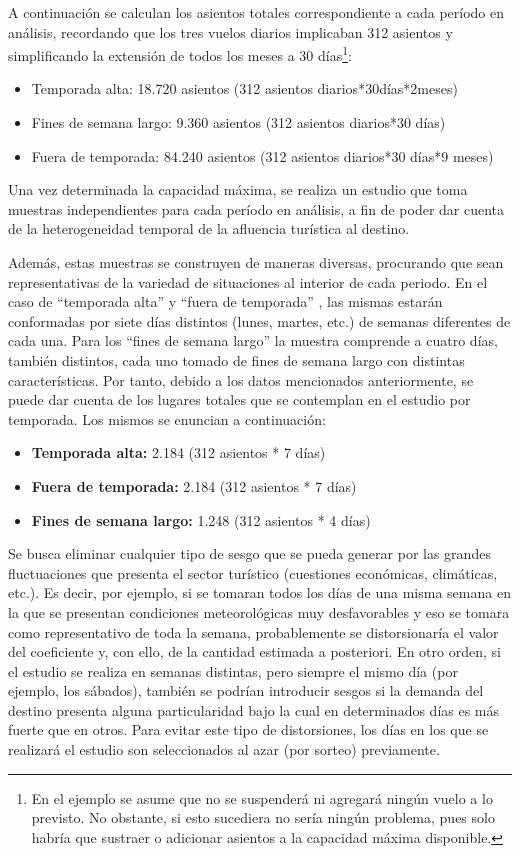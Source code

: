 \documentclass[
]{book}
\begin{document}
A continuación se calculan los asientos totales correspondiente a cada período en análisis, recordando que los tres vuelos diarios implicaban 312 asientos y simplificando la extensión de todos los meses a 30 días\footnote{En el ejemplo se asume que no se suspenderá ni agregará ningún vuelo a lo previsto. No obstante, si esto sucediera no sería ningún problema, pues solo habría que sustraer o adicionar asientos a la capacidad máxima disponible.}:

\begin{itemize}
\item
  Temporada alta: 18.720 asientos (312 asientos diarios*30días*2meses)
\item
  Fines de semana largo: 9.360 asientos (312 asientos diarios*30 días)
\item
  Fuera de temporada: 84.240 asientos (312 asientos diarios*30 días*9 meses)
\end{itemize}

Una vez determinada la capacidad máxima, se realiza un estudio que toma muestras independientes para cada período en análisis, a fin de poder dar cuenta de la heterogeneidad temporal de la afluencia turística al destino.

Además, estas muestras se construyen de maneras diversas, procurando que sean representativas de la variedad de situaciones al interior de cada periodo. En el caso de ``temporada alta'' y ``fuera de temporada'' , las mismas estarán conformadas por siete días distintos (lunes, martes, etc.) de semanas diferentes de cada una. Para los ``fines de semana largo'' la muestra comprende a cuatro días, también distintos, cada uno tomado de fines de semana largo con distintas características. Por tanto, debido a los datos mencionados anteriormente, se puede dar cuenta de los lugares totales que se contemplan en el estudio por temporada. Los mismos se enuncian a continuación:

\begin{itemize}
\item
  \textbf{Temporada alta:} 2.184 (312 asientos * 7 días)
\item
  \textbf{Fuera de temporada:} 2.184 (312 asientos * 7 días)
\item
  \textbf{Fines de semana largo:} 1.248 (312 asientos * 4 días)
\end{itemize}

\hfill\break
Se busca eliminar cualquier tipo de sesgo que se pueda generar por las grandes fluctuaciones que presenta el sector turístico (cuestiones económicas, climáticas, etc.). Es decir, por ejemplo, si se tomaran todos los días de una misma semana en la que se presentan condiciones meteorológicas muy desfavorables y eso se tomara como representativo de toda la semana, probablemente se distorsionaría el valor del coeficiente y, con ello, de la cantidad estimada a posteriori. En otro orden, si el estudio se realiza en semanas distintas, pero siempre el mismo día (por ejemplo, los sábados), también se podrían introducir sesgos si la demanda del destino presenta alguna particularidad bajo la cual en determinados días es más fuerte que en otros. Para evitar este tipo de distorsiones, los días en los que se realizará el estudio son seleccionados al azar (por sorteo) previamente.
\end{document}
